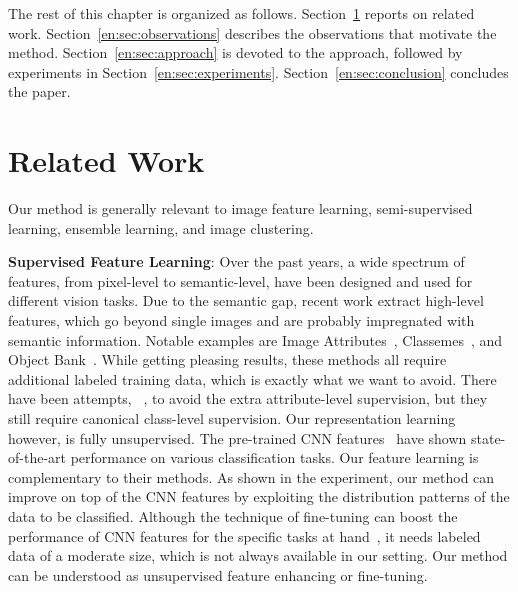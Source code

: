 The rest of this chapter is organized as follows. Section~\ref{en:sec:related}
reports on related work. Section~\ref{en:sec:observations} describes the
observations that motivate the method. Section~\ref{en:sec:approach} is devoted to the approach, followed by experiments in
Section~\ref{en:sec:experiments}. Section~\ref{en:sec:conclusion} concludes the
paper.


\section{Related Work}
\label{en:sec:related}
Our method is generally relevant to image feature learning, semi-supervised
learning, ensemble learning, and image clustering.


\textbf{Supervised Feature Learning}: Over the past years, a wide spectrum of
features, from pixel-level to semantic-level, have been designed and
used for different vision tasks. Due to the semantic gap, recent work
extract high-level features, which go beyond single images and are
probably impregnated with semantic information. Notable examples are
Image Attributes~\citep{ObjectAttribute:cvpr09},
Classemes~\citep{eccv10:classemes}, and Object
Bank~\citep{objectbank:nips10}. While getting pleasing results, these
methods all require additional labeled training data, which is exactly
what we want to avoid.  There have been
attempts, \eg~\citep{augmented_attribute:eccv12, design_attribute:cvpr13}, to
avoid the extra attribute-level supervision, but they still require
canonical class-level supervision. Our representation learning
however, is fully unsupervised.  
The pre-trained CNN features~\citep{nips12:cnn, decaf, rich:feature:cvpr14, deep:bmvc14}
have shown state-of-the-art performance on various classification tasks. Our feature 
learning is complementary to their methods. As shown in the experiment, our method can improve on top of 
the CNN features by exploiting the distribution patterns of the data to be classified.  
Although the technique of fine-tuning can 
boost the performance of CNN features for 
the specific tasks at hand~\citep{midlevel:transfer, cnn:transferable}, it needs labeled data of a moderate size, 
which is not always available in our setting.
Our method can be understood as unsupervised feature enhancing or fine-tuning.


